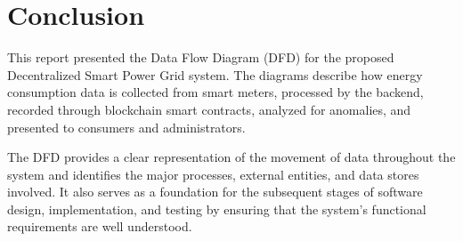 \section{Conclusion}

This report presented the Data Flow Diagram (DFD) for the proposed
Decentralized Smart Power Grid system. The diagrams describe how
energy consumption data is collected from smart meters, processed by
the backend, recorded through blockchain smart contracts, analyzed for
anomalies, and presented to consumers and administrators.

The DFD provides a clear representation of the movement of data
throughout the system and identifies the major processes, external
entities, and data stores involved. It also serves as a foundation for
the subsequent stages of software design, implementation, and testing by
ensuring that the system's functional requirements are well understood.